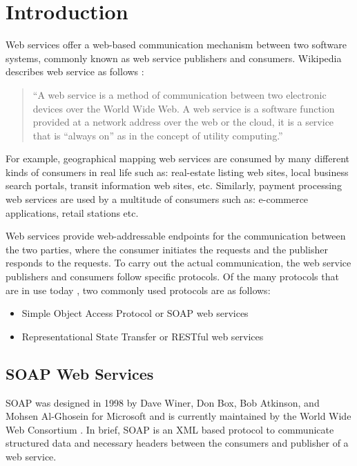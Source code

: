 \documentclass[runningheads,a4paper]{llncs}
\begin{document}
\section{Introduction}

Web services offer a web-based communication mechanism between two software systems, commonly known as web service publishers and consumers. Wikipedia describes web service as follows \cite{web_service_wiki}:

\begin{quote}
``A web service is a method of communication between two electronic devices over the World Wide Web. A web service is a software function provided at a network address over the web or the cloud, it is a service that is ``always on'' as in the concept of utility computing.''
\end{quote}

For example, geographical mapping web services are consumed by many different kinds of consumers in real life such as: real-estate listing web sites, local business search portals, transit information web sites, etc. Similarly, payment processing web services are used by a multitude of consumers such as: e-commerce applications, retail stations etc.

Web services provide web-addressable endpoints for the communication between the two parties, where the consumer initiates the requests and the publisher responds to the requests. To carry out the actual communication, the web service publishers and consumers follow specific protocols. Of the many protocols that are in use today \cite{web_service_protocols_wiki}, two commonly used protocols are as follows:

\begin{itemize}
  \item Simple Object Access Protocol or SOAP web services
  \item Representational State Transfer or RESTful web services
\end{itemize}


\subsection{SOAP Web Services} %
\label{sub:soap_web_services}
SOAP was designed in 1998 by Dave Winer, Don Box, Bob Atkinson, and Mohsen Al-Ghosein for Microsoft and is currently maintained by the World Wide Web Consortium \cite{soap_wiki}. In brief, SOAP is an XML based protocol to communicate structured data and necessary headers between the consumers and publisher of a web service.
\end{document}

